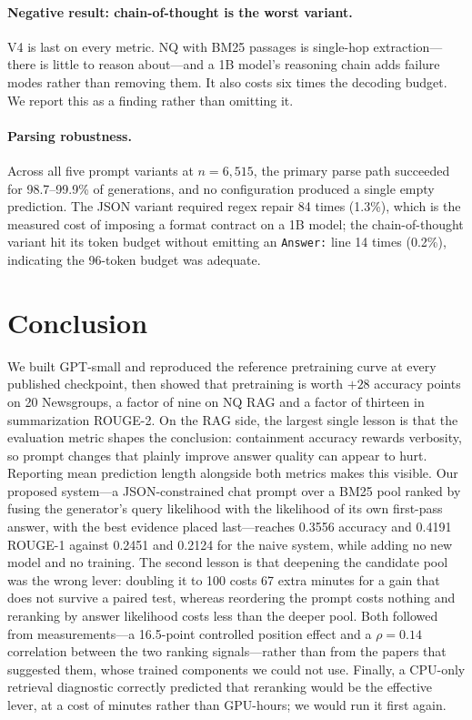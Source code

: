 \documentclass[11pt]{article}
\begin{document}
\paragraph{Negative result: chain-of-thought is the worst variant.} \textsc{V4} is last on
every metric. NQ with BM25 passages is single-hop extraction---there is little to reason
about---and a 1B model's reasoning chain adds failure modes rather than removing them. It also
costs six times the decoding budget. We report this as a finding rather than omitting it.

\paragraph{Parsing robustness.} Across all five prompt variants at $n=6{,}515$, the primary
parse path succeeded for 98.7--99.9\% of generations, and no configuration produced a single
empty prediction. The JSON variant required regex repair 84 times (1.3\%), which is the
measured cost of imposing a format contract on a 1B model; the chain-of-thought variant hit
its token budget without emitting an \texttt{Answer:} line 14 times (0.2\%), indicating the
96-token budget was adequate.

\section{Conclusion}

We built GPT-small and reproduced the reference pretraining curve at every published
checkpoint, then showed that pretraining is worth $+28$ accuracy points on 20 Newsgroups, a factor of
nine on NQ RAG and a factor of thirteen in summarization ROUGE-2. On the RAG side, the largest single lesson is that the evaluation
metric shapes the conclusion: containment accuracy rewards verbosity, so prompt changes that
plainly improve answer quality can appear to hurt. Reporting mean prediction length alongside
both metrics makes this visible. Our proposed system---a JSON-constrained chat prompt over a
BM25 pool ranked by fusing the generator's query likelihood with the likelihood of its own
first-pass answer, with the best evidence placed last---reaches 0.3556 accuracy and 0.4191
ROUGE-1 against 0.2451 and 0.2124 for the naive system, while adding no new model and no
training. The second lesson is that deepening the candidate pool was the wrong lever: doubling
it to 100 costs 67 extra minutes for a gain that does not survive a paired test, whereas
reordering the prompt costs nothing and reranking by answer likelihood costs less than the
deeper pool. Both followed from measurements---a 16.5-point controlled position effect and a
$\rho{=}0.14$ correlation between the two ranking signals---rather than from the papers that
suggested them, whose trained components we could not use. Finally, a CPU-only retrieval
diagnostic correctly predicted that reranking would be the effective lever, at a cost of
minutes rather than GPU-hours; we would run it first again.
\end{document}
